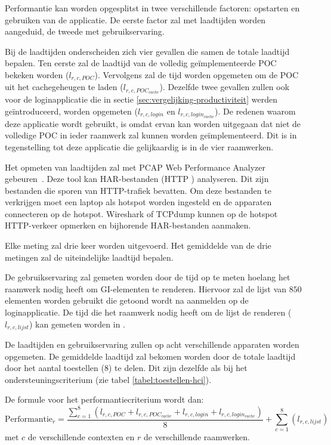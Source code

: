 Performantie kan worden opgesplitst in twee verschillende factoren: opstarten en gebruiken van de applicatie.
De eerste factor zal met laadtijden worden aangeduid,  de tweede met gebruikservaring.

Bij de laadtijden onderscheiden zich vier gevallen die samen de totale laadtijd bepalen.
Ten eerste zal de laadtijd van de volledig geïmplementeerde POC bekeken worden ($l_{r,c,POC}$). 
Vervolgens zal de tijd worden opgemeten om de POC uit het cachegeheugen te laden ($l_{r,c,POC_{cache}}$).
Dezelfde twee gevallen zullen ook voor de loginapplicatie die in sectie \ref{sec:vergelijking-productiviteit} werden geïntroduceerd, worden opgemeten ($l_{r,c,login}$ en $l_{r,c,login_{cache}}$).
De redenen waarom deze applicatie wordt gebruikt, is omdat ervan kan worden uitgegaan dat niet de volledige POC in ieder raamwerk zal kunnen worden geïmplementeerd. 
Dit is in tegenstelling tot deze applicatie die gelijkaardig is in de vier raamwerken.

Het opmeten van laadtijden zal met PCAP Web Performance Analyzer gebeuren~\cite{SongL.bmcquadeMdsteele2010}.
Deze tool kan HAR-bestanden (HTTP ) analyseren.
Dit zijn bestanden die sporen van HTTP-trafiek bevatten.
Om deze bestanden te verkrijgen moet een laptop als hotspot worden ingesteld en de apparaten connecteren op de hotspot.
Wireshark of TCPdump kunnen op de hotspot HTTP-verkeer opmerken en bijhorende HAR-bestanden aanmaken.

Elke meting zal drie keer worden uitgevoerd. %
Het gemiddelde van de drie metingen zal de uiteindelijke laadtijd bepalen. %

De gebruikservaring zal gemeten worden door de tijd op te meten hoelang het raamwerk nodig heeft om GI-elementen te renderen.
Hiervoor zal de lijst van $850$ elementen worden gebruikt die getoond wordt na aanmelden op de loginapplicatie.
De tijd die het raamwerk nodig heeft om de lijst de renderen ($l_{r,c,lijst}$) kan gemeten worden in \js.

De laadtijden en gebruikservaring zullen op acht verschillende apparaten worden opgemeten.
De gemiddelde laadtijd zal bekomen worden door de totale laadtijd door het aantal toestellen ($8$) te delen.
Dit zijn dezelfde als bij het ondersteuningscriterium (zie tabel \ref{tabel:toestellen-hci}).

De formule voor het performantiecriterium wordt dan: 
\begin{equation}
  \text{Performantie}_r= \frac{\sum_{c=1}^{8}{\left(l_{r,c,POC}+l_{r,c,POC_{cache}}+l_{r,c,login}+l_{r,c,login_{cache}}\right)}}{8}  + \sum_{c=1}^{8}{\left(l_{r,c,lijst}\right)} 
  \label{eq:performantie}
\end{equation}
met $c$ de verschillende contexten en $r$ de verschillende raamwerken.

